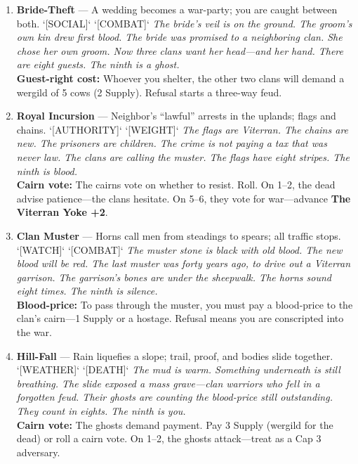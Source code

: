 \begin{enumerate}
\item[J] \textbf{Bride-Theft} --- A wedding becomes a war-party; you are caught between both. `[SOCIAL]` `[COMBAT]`
  \hfill \textit{The bride's veil is on the ground. The groom's own kin drew first blood. The bride was promised to a neighboring clan. She chose her own groom. Now three clans want her head---and her hand. There are eight guests. The ninth is a ghost.} \\
  \textbf{Guest-right cost:} Whoever you shelter, the other two clans will demand a wergild of 5 cows (2 Supply). Refusal starts a three-way feud.

\item[Q] \textbf{Royal Incursion} --- Neighbor's ``lawful'' arrests in the uplands; flags and chains. `[AUTHORITY]` `[WEIGHT]`
  \hfill \textit{The flags are Viterran. The chains are new. The prisoners are children. The crime is not paying a tax that was never law. The clans are calling the muster. The flags have eight stripes. The ninth is blood.} \\
  \textbf{Cairn vote:} The cairns vote on whether to resist. Roll. On 1--2, the dead advise patience---the clans hesitate. On 5--6, they vote for war---advance \textbf{The Viterran Yoke +2}.

\item[K] \textbf{Clan Muster} --- Horns call men from steadings to spears; all traffic stops. `[WATCH]` `[COMBAT]`
  \hfill \textit{The muster stone is black with old blood. The new blood will be red. The last muster was forty years ago, to drive out a Viterran garrison. The garrison's bones are under the sheepwalk. The horns sound eight times. The ninth is silence.} \\
  \textbf{Blood-price:} To pass through the muster, you must pay a blood-price to the clan's cairn---1 Supply or a hostage. Refusal means you are conscripted into the war.

\item[A] \textbf{Hill-Fall} --- Rain liquefies a slope; trail, proof, and bodies slide together. `[WEATHER]` `[DEATH]`
  \hfill \textit{The mud is warm. Something underneath is still breathing. The slide exposed a mass grave---clan warriors who fell in a forgotten feud. Their ghosts are counting the blood-price still outstanding. They count in eights. The ninth is you.} \\
  \textbf{Cairn vote:} The ghosts demand payment. Pay 3 Supply (wergild for the dead) or roll a cairn vote. On 1--2, the ghosts attack---treat as a Cap 3 adversary.
\end{enumerate}

